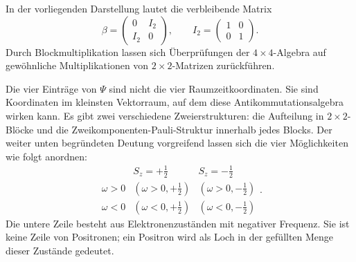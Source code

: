 \begin{classroomqa}
\end{classroomqa}

In der vorliegenden Darstellung lautet die verbleibende Matrix
\begin{equation}
\beta=
\begin{pmatrix}
0&I_2\\
I_2&0
\end{pmatrix},
\qquad
I_2=
\begin{pmatrix}
1&0\\
0&1
\end{pmatrix}.
\end{equation}
Durch Blockmultiplikation lassen sich Überprüfungen der \(4\times4\)-Algebra auf gewöhnliche Multiplikationen von \(2\times2\)-Matrizen zurückführen.

\begin{classroomqa}
\end{classroomqa}

Die vier Einträge von \(\Psi\) sind nicht die vier Raumzeitkoordinaten. Sie sind Koordinaten im kleinsten Vektorraum, auf dem diese Antikommutationsalgebra wirken kann. Es gibt zwei verschiedene Zweierstrukturen: die Aufteilung in \(2\times2\)-Blöcke und die Zweikomponenten-Pauli-Struktur innerhalb jedes Blocks. Der weiter unten begründeten Deutung vorgreifend lassen sich die vier Möglichkeiten wie folgt anordnen:
\begin{equation}
\begin{array}{c|cc}
& S_z=+\tfrac12 & S_z=-\tfrac12\\ \hline
\omega>0 & (\omega>0,+\tfrac12) & (\omega>0,-\tfrac12)\\
\omega<0 & (\omega<0,+\tfrac12) & (\omega<0,-\tfrac12)
\end{array}.
\end{equation}
Die untere Zeile besteht aus Elektronenzuständen mit negativer Frequenz. Sie ist keine Zeile von Positronen; ein Positron wird als Loch in der gefüllten Menge dieser Zustände gedeutet.

